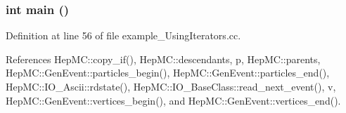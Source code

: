 \subsubsection{\setlength{\rightskip}{0pt plus 5cm}int main ()}\label{example__UsingIterators_8cc_e66f6b31b5ad750f1fe042a706a4e3d4}




Definition at line 56 of file example\_\-Using\-Iterators.cc.

References Hep\-MC::copy\_\-if(), Hep\-MC::descendants, p, Hep\-MC::parents, Hep\-MC::Gen\-Event::particles\_\-begin(), Hep\-MC::Gen\-Event::particles\_\-end(), Hep\-MC::IO\_\-Ascii::rdstate(), Hep\-MC::IO\_\-Base\-Class::read\_\-next\_\-event(), v, Hep\-MC::Gen\-Event::vertices\_\-begin(), and Hep\-MC::Gen\-Event::vertices\_\-end().